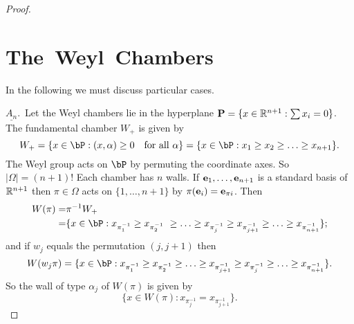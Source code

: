 \documentclass{memo-l}
\theoremstyle{definition}
\theoremstyle{remark}
\numberwithin{section}{chapter}
\numberwithin{equation}{chapter}
\begin{document}
\begin{proof}
\medskip
\medskip

\section*{ The\ Weyl\ Chambers}

   In the following we must discuss particular cases.

\noindent
$\underline{A_n}.$\  Let the Weyl chambers lie in the hyperplane 
${\bold	P} = \{ x  \in  {\Bbb R}^{n+1}: \sum x_{i} = 0\}$.  
The fundamental chamber	$W_{+}$ is given by 
$$
W_{+} = \{ x \in \bP: (x,{\alpha}) \ge 0\quad  {\text{for\ all}}\ 
{\alpha}\} = \{ x  \in  \bP: x_{1} \ge x_{2} \ge \ldots \ge x_{n+1}\}.
$$
The Weyl group acts on $\bP$ by permuting the coordinate axes.  So
$\vert {\Omega}\vert = (n+1)$!  Each chamber has $n$ walls.  If ${\bold
e_{1}},\ldots ,{\bold e_{n+1}}$ is a standard basis of ${\Bbb R}^{n+1}$
then ${\pi}  \in  {\Omega}$ acts on $\{1,\ldots ,n+1\}$ by 
${\pi}({\bold e_{i}}) = {\bold e_{{\pi}i}}$.  
Then 
$$\aligned
W({\pi}) =& {\pi}^{-1}W_{+} \\ =&
\{x  \in  \bP: x_{\pi_1^{-1}} \ge x_{\pi_2^{-1}}\ \ge \ldots \ge 
x_{\pi_j^{-1}} \ge x_{\pi_{j+1}^{-1}}  \ge \ldots \ge 
x_{\pi_{n+1}^{-1}}\};\endaligned
$$
and if $w_{j}$ equals the permutation $(j,j+1)$ then 
$$
W(w_j{\pi}) = \{ x \in \bP: x_{\pi_1^{-1}} \ge 
x_{\pi_2^{-1}} \ge \ldots \ge x_{\pi_{j+1}^{-1}} \ge x_{\pi_j^{-1}} 
\ge \ldots \ge x_{\pi_{n+1}^{-1}} \}.
$$
So the wall of type ${\alpha}_{j}$ of $W({\pi})$ is given by
$$
\{x  \in  W({\pi}): x_{\pi_j^{-1}} = x_{\pi_{j+1}^{-1}}\}.
$$



\end{proof}
\end{document}
